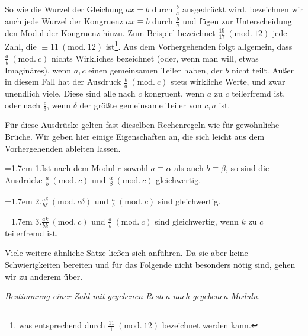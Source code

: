
So wie die Wurzel der Gleichung $ax=b$ durch $\frac{b}{a}$ ausgedrückt wird, bezeichnen wir auch jede Wurzel der Kongruenz $ax\equiv b$ durch $\frac{b}{a}$ und fügen zur Unterscheidung den Modul der Kongruenz hinzu. Zum Beispiel bezeichnet $\frac{19}{17}\ (\mathrm{mod.}\ 12)$ jede Zahl, die $\equiv 11\ (\mathrm{mod.}\ 12)$ ist\begingroup\renewcommand{\thefootnote}{*)}\footnote{was entsprechend durch $\frac{11}{1}\ (\mathrm{mod.}\ 12)$ bezeichnet werden kann.}\endgroup. Aus dem Vorhergehenden folgt allgemein, dass $\frac{a}{b}\ (\mathrm{mod.}\ c)$ nichts Wirkliches bezeichnet (oder, wenn man will, etwas Imaginäres), wenn $a,c$ einen gemeinsamen Teiler haben, der $b$ nicht teilt. Außer in diesem Fall hat der Ausdruck $\frac{b}{a}\ (\mathrm{mod.}\ c)$ stets wirkliche Werte, und zwar unendlich viele. Diese sind alle nach $c$ kongruent, wenn $a$ zu $c$ teilerfremd ist, oder nach $\frac{c}{\delta}$, wenn $\delta$ der größte gemeinsame Teiler von $c,a$ ist.

Für diese Ausdrücke gelten fast dieselben Rechenregeln wie für gewöhnliche Brüche. Wir geben hier einige Eigenschaften an, die sich leicht aus dem Vorhergehenden ableiten lassen.

\hangindent=1.7em
1.\quad Ist nach dem Modul $c$ sowohl $a\equiv\alpha$ als auch $b\equiv\beta$, so sind die Ausdrücke $\frac{a}{b}\ (\mathrm{mod.}\ c)$ und $\frac{\alpha}{\beta}\ (\mathrm{mod.}\ c)$ gleichwertig.

\hangindent=1.7em
2.\quad $\frac{a\delta}{b\delta}\ (\mathrm{mod.}\ c\delta)$ und $\frac{a}{b}\ (\mathrm{mod.}\ c)$ sind gleichwertig.

\hangindent=1.7em
3.\quad $\frac{ak}{bk}\ (\mathrm{mod.}\ c)$ und $\frac{a}{b}\ (\mathrm{mod.}\ c)$ sind gleichwertig, wenn $k$ zu $c$ teilerfremd ist.

Viele weitere ähnliche Sätze ließen sich anführen. Da sie aber keine Schwierigkeiten bereiten und für das Folgende nicht besonders nötig sind, gehen wir zu anderem über.

\begin{center}\small\emph{Bestimmung einer Zahl mit gegebenen Resten nach gegebenen Moduln.}\end{center}


